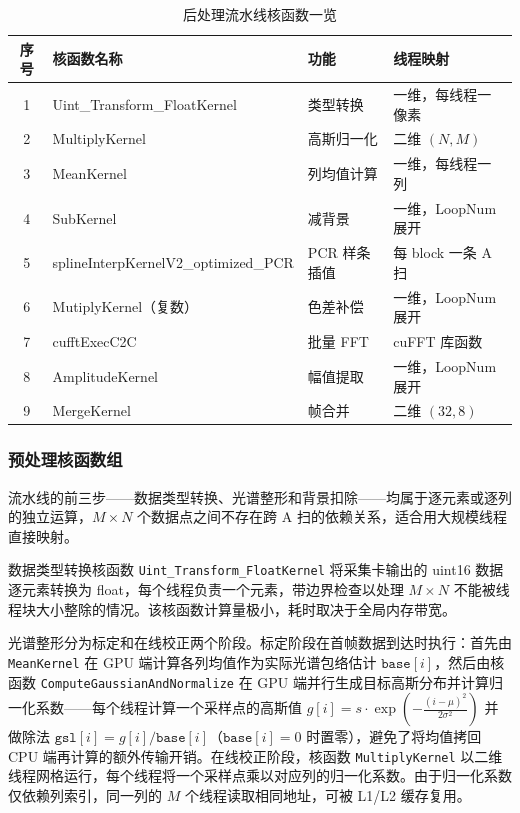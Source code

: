 \begin{table}[htbp]
\centering
\caption{后处理流水线核函数一览}
\label{tab:kernel_list}
\begin{tabular}{clll}
\toprule
序号 & 核函数名称 & 功能 & 线程映射 \\
\midrule
1 & Uint\_Transform\_FloatKernel & 类型转换 & 一维，每线程一像素 \\
2 & MultiplyKernel & 高斯归一化 & 二维 $(N, M)$ \\
3 & MeanKernel & 列均值计算 & 一维，每线程一列 \\
4 & SubKernel & 减背景 & 一维，LoopNum 展开 \\
5 & splineInterpKernelV2\_optimized\_PCR & PCR 样条插值 & 每 block 一条 A 扫 \\
6 & MutiplyKernel（复数） & 色差补偿 & 一维，LoopNum 展开 \\
7 & cufftExecC2C & 批量 FFT & cuFFT 库函数 \\
8 & AmplitudeKernel & 幅值提取 & 一维，LoopNum 展开 \\
9 & MergeKernel & 帧合并 & 二维 $(32, 8)$ \\
\bottomrule
\end{tabular}
\end{table}

\subsubsection{预处理核函数组}

流水线的前三步——数据类型转换、光谱整形和背景扣除——均属于逐元素或逐列的独立运算，$M \times N$ 个数据点之间不存在跨 A 扫的依赖关系，适合用大规模线程直接映射。

数据类型转换核函数 \texttt{Uint\_Transform\_FloatKernel} 将采集卡输出的 uint16 数据逐元素转换为 float，每个线程负责一个元素，带边界检查以处理 $M \times N$ 不能被线程块大小整除的情况。该核函数计算量极小，耗时取决于全局内存带宽。

光谱整形分为标定和在线校正两个阶段。标定阶段在首帧数据到达时执行：首先由 \texttt{MeanKernel} 在 GPU 端计算各列均值作为实际光谱包络估计 $\texttt{base}[i]$，然后由核函数 \texttt{ComputeGaussianAndNormalize} 在 GPU 端并行生成目标高斯分布并计算归一化系数——每个线程计算一个采样点的高斯值 $g[i] = s \cdot \exp\!\left(-\frac{(i - \mu)^2}{2\sigma^2}\right)$ 并做除法 $\texttt{gsl}[i] = g[i] / \texttt{base}[i]$（$\texttt{base}[i] = 0$ 时置零），避免了将均值拷回 CPU 端再计算的额外传输开销。在线校正阶段，核函数 \texttt{MultiplyKernel} 以二维线程网格运行，每个线程将一个采样点乘以对应列的归一化系数。由于归一化系数仅依赖列索引，同一列的 $M$ 个线程读取相同地址，可被 L1/L2 缓存复用。

